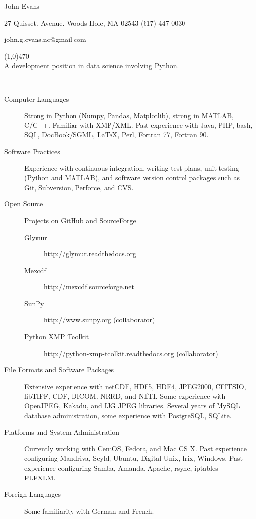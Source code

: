 \documentclass[11pt]{article}  %
\begin{document}
 
\centerline{{\Huge \sc John Evans}  }   %
\centerline{27 Quissett Avenue. \textbullet \hspace{5pt} Woods Hole, MA  02543 \textbullet \hspace{5pt}  (617) 447-0030} 
\centerline{john.g.evans.ne@gmail.com} 
\noindent
\line(1,0){470}  \\

\smallskip %
\noindent
A development position in data science involving Python.\medskip

\bigskip %
\\ 
\begin{description}
  \item[Computer Languages]Strong in Python (Numpy, Pandas, Matplotlib), strong
    in MATLAB, C/C++.  Familiar with XMP/XML.  Past experience with Java, PHP,
    bash, SQL, DocBook/SGML, \LaTeX, Perl, Fortran 77, Fortran 90.
  \item[Software Practices]Experience with continuous integration, writing
    test plans, unit testing (Python and MATLAB), and software version control
    packages such as Git, Subversion, Perforce, and CVS.
  \item[Open Source]Projects on GitHub and SourceForge
    \begin{description}
      \item[Glymur]\url{http://glymur.readthedocs.org}
      \item[Mexcdf]\url{http://mexcdf.sourceforge.net}
      \item[SunPy]\url{http://www.sunpy.org} (collaborator)
      \item[Python XMP Toolkit]\url{http://python-xmp-toolkit.readthedocs.org}
        (collaborator)
    \end{description}
  \item[File Formats and Software Packages]Extensive experience with netCDF,
    HDF5, HDF4, JPEG2000, CFITSIO, libTIFF, CDF, DICOM, NRRD, and NIfTI.  Some
    experience with OpenJPEG, Kakadu, and IJG JPEG libraries.  Several years of
    MySQL database administration, some experience with PostgreSQL, SQLite.
  \item[Platforms and System Administration]Currently working with CentOS,
    Fedora, and Mac OS X.  Past experience configuring Mandriva, Scyld, Ubuntu,
    Digital Unix, Irix, Windows.  Past experience configuring Samba, Amanda,
    Apache, rsync, iptables, FLEXLM.
  \item[Foreign Languages]Some familiarity with German and French.
\end{description}
\end{document}
